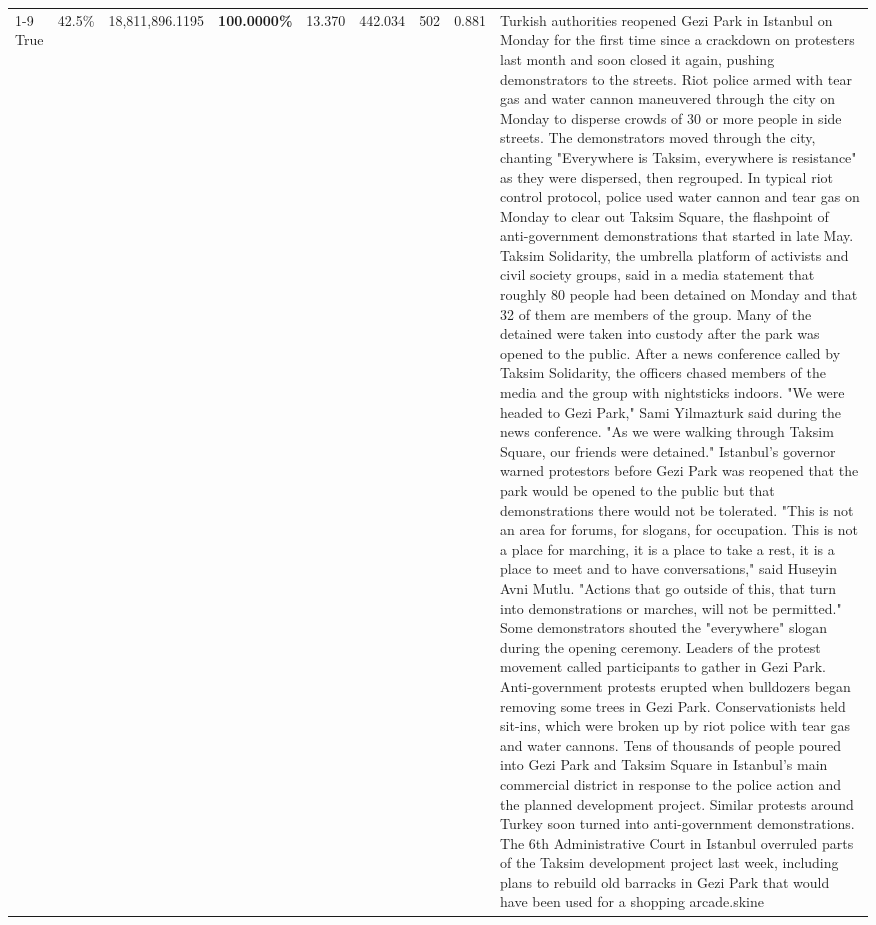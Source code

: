 \begin{table}[H]
\begin{tabular}{lllrlllll}
\cline{1-9}
True & 42.5\% & 18,811,896.1195 & \bfseries \color{red} 100.0000\% & 13.370 & 442.034 & 502 & 0.881 & Turkish authorities reopened Gezi Park in Istanbul on Monday for the first time since a crackdown on protesters last month and soon closed it again, pushing demonstrators to the streets. Riot police armed with tear gas and water cannon maneuvered through the city on Monday to disperse crowds of 30 or more people in side streets. The demonstrators moved through the city, chanting "Everywhere is Taksim, everywhere is resistance" as they were dispersed, then regrouped. In typical riot control protocol, police used water cannon and tear gas on Monday to clear out Taksim Square, the flashpoint of anti-government demonstrations that started in late May. Taksim Solidarity, the umbrella platform of activists and civil society groups, said in a media statement that roughly 80 people had been detained on Monday and that 32 of them are members of the group. Many of the detained were taken into custody after the park was opened to the public. After a news conference called by Taksim Solidarity, the officers chased members of the media and the group with nightsticks indoors. "We were headed to Gezi Park," Sami Yilmazturk said during the news conference. "As we were walking through Taksim Square, our friends were detained." Istanbul's governor warned protestors before Gezi Park was reopened that the park would be opened to the public but that demonstrations there would not be tolerated. "This is not an area for forums, for slogans, for occupation. This is not a place for marching, it is a place to take a rest, it is a place to meet and to have conversations," said Huseyin Avni Mutlu. "Actions that go outside of this, that turn into demonstrations or marches, will not be permitted." Some demonstrators shouted the "everywhere" slogan during the opening ceremony. Leaders of the protest movement called participants to gather in Gezi Park. Anti-government protests erupted when bulldozers began removing some trees in Gezi Park. Conservationists held sit-ins, which were broken up by riot police with tear gas and water cannons. Tens of thousands of people poured into Gezi Park and Taksim Square in Istanbul's main commercial district in response to the police action and the planned development project. Similar protests around Turkey soon turned into anti-government demonstrations. The 6th Administrative Court in Istanbul overruled parts of the Taksim development project last week, including plans to rebuild old barracks in Gezi Park that would have been used for a shopping arcade.skine \\

\end{tabular}
\end{table}
